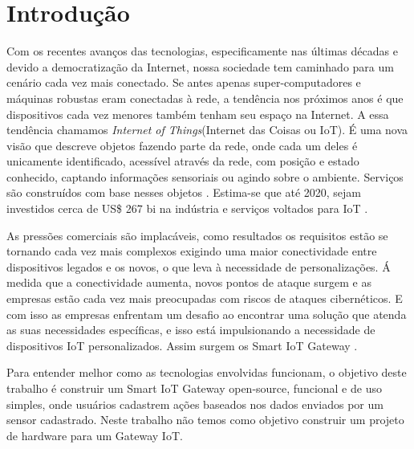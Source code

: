 \section*{Introdução}
\label{sec:intro}

Com os recentes avanços das tecnologias, especificamente nas últimas décadas e devido a democratização da Internet, nossa sociedade tem caminhado para um cenário cada vez mais conectado. Se antes apenas super-computadores e máquinas robustas eram conectadas à rede, a tendência nos próximos anos é que dispositivos cada vez menores também tenham seu espaço na Internet.
A essa tendência chamamos \textit{Internet of Things}(Internet das Coisas ou IoT). É uma nova visão que descreve objetos fazendo parte da rede, onde cada um deles é unicamente identificado, acessível através da rede, com posição e estado conhecido, captando informações sensoriais ou agindo sobre o ambiente. Serviços são construídos com base nesses objetos \cite{ComputerWorld}. Estima-se que até 2020, sejam investidos cerca de US\$ 267 bi na indústria e serviços voltados para IoT \cite{BCGPerspectives,Forbes}.

As pressões comerciais são implacáveis, como resultados os requisitos estão se tornando cada vez mais complexos exigindo uma maior conectividade entre dispositivos legados e os novos, o que leva à necessidade de personalizações. Á medida que a conectividade aumenta, novos pontos de ataque surgem e as empresas estão cada vez mais preocupadas com riscos de ataques cibernéticos. E com isso as empresas enfrentam um desafio ao encontrar uma solução que atenda as suas necessidades específicas, e isso está impulsionando a necessidade de dispositivos IoT personalizados. Assim surgem os Smart IoT Gateway \cite{EETAsia}. 

Para entender melhor como as tecnologias envolvidas funcionam, o objetivo deste trabalho é construir um Smart IoT Gateway open-source, funcional e de uso simples, onde usuários cadastrem ações baseados nos dados enviados por um sensor cadastrado. Neste trabalho não temos como objetivo construir um projeto de hardware para um Gateway IoT.
